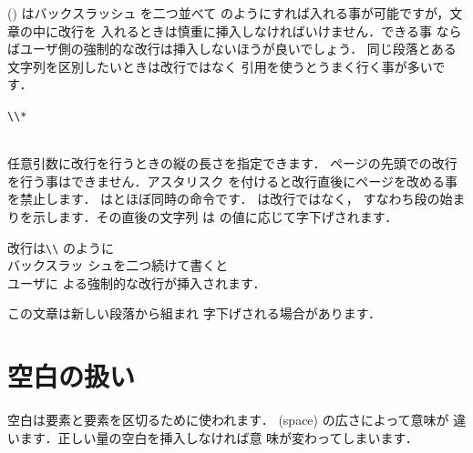 {%
 () はバックスラッシュ\qu{\texttt\bs}%
を二つ並べて\qu{\texttt{\bs\bs}}
のようにすれば入れる事が可能ですが，文章の中に改行を
入れるときは慎重に挿入しなければいけません．できる事
ならばユーザ側の強制的な改行は挿入しないほうが良いでしょう．
同じ段落とある文字列を区別したいときは改行ではなく
引用を使うとうまく行く事が多いです．
\begin{Syntax}
\verb|\\*|\\
 \\
\end{Syntax}
任意引数に改行を行うときの縦の長さを指定できます．
ページの先頭での改行を行う事はできません．アスタリスク
を付けると改行直後にページを改める事を禁止します．
   は\qu{\texttt{\bs\bs}}とほぼ同時の命令です．
   は改行ではなく，
すなわち段の始まりを示します．その直後の文字列
は  の値に応じて字下げされます．
\begin{InOut}
改行は\verb|\\| のように\\バックスラッ
シュを二つ続けて書くと\\[1cm]ユーザに
よる強制的な改行が挿入されます．\par
この文章は新しい段落から組まれ
\newline 字下げされる場合があります．
\end{InOut}



\section{空白の扱い}
%
空白は要素と要素を区切るために使われます．
 (space) の広さによって意味が
違います．正しい量の空白を挿入しなければ意
味が変わってしまいます．

}
